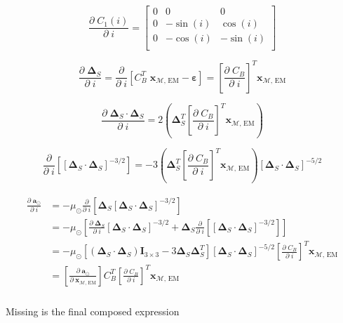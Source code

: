 \documentclass[]{article}
\newcommand{\pd}[2]{\frac{\partial\;#1}{\partial\;#2}}
\newcommand{\pddown}[2]{\frac{\partial}{\partial\;#2} \left[ #1 \right] }
\begin{document}
	\begin{equation*}
		\pd{C_1(i)}{i} = \begin{bmatrix}
			0 & 0 & 0 \\
			0 & -\sin{(i)} & \cos{(i)} \\
			0 & -\cos{(i)} & -\sin{(i)} \\
		\end{bmatrix}
	\end{equation*}
	
	\begin{equation*}
		\pd{\boldsymbol{\Delta}_S}{i} = \pddown{C_B^T \; \mathbf{x}_{\mathcal{M}\text{, EM}} - \boldsymbol{\varepsilon}}{i} = \left[ \pd{C_B}{i} \right]^T \mathbf{x}_{\mathcal{M}\text{, EM}}
	\end{equation*}
	
	\begin{equation*}
		\pd{\boldsymbol{\Delta}_S \cdot \boldsymbol{\Delta}_S}{i} = 2\left( \boldsymbol{\Delta}_S^T \left[ \pd{C_B}{i} \right]^T \mathbf{x}_{\mathcal{M}\text{, EM}} \right)
	\end{equation*}
	
	\begin{equation*}
		\pddown{ [\boldsymbol{\Delta}_S \cdot \boldsymbol{\Delta}_S]^{-3/2} }{i} = -3 \left( \boldsymbol{\Delta}_S^T \left[ \pd{C_B}{i} \right]^T \mathbf{x}_{\mathcal{M}\text{, EM}} \right) [\boldsymbol{\Delta}_S \cdot \boldsymbol{\Delta}_S]^{-5/2}
	\end{equation*}
	
	\begin{align}
	\begin{split}
		\pd{\mathbf{a}_{\odot}}{i} 
		&= -\mu_\odot \pddown{ \boldsymbol{\Delta}_S [\boldsymbol{\Delta}_S \cdot \boldsymbol{\Delta}_S]^{-3/2} }{i} \\
		&= -\mu_\odot \left[ \pd{ \boldsymbol{\Delta}_S }{i}[\boldsymbol{\Delta}_S \cdot \boldsymbol{\Delta}_S]^{-3/2} + \boldsymbol{\Delta}_S  \pddown{ [\boldsymbol{\Delta}_S \cdot \boldsymbol{\Delta}_S]^{-3/2} }{i} \right] \\
		&= -\mu_\odot \left[ (\boldsymbol{\Delta}_S \cdot \boldsymbol{\Delta}_S)\mathbf{I}_{3\times 3} - 3 \boldsymbol{\Delta}_S \boldsymbol{\Delta}_S^T \right] [\boldsymbol{\Delta}_S \cdot \boldsymbol{\Delta}_S]^{-5/2} \left[ \pd{C_B}{i} \right]^T \mathbf{x}_{\mathcal{M}\text{, EM}} \\
		&= \left[\pd{\mathbf{a}_{\odot}}{ \mathbf{x}_{\mathcal{M}\text{, EM}} }\right] C_B^T \left[ \pd{C_B}{i} \right]^T \mathbf{x}_{\mathcal{M}\text{, EM}} \\
	\end{split}
	\end{align}
	
	Missing is the final composed expression
	
\end{document}
